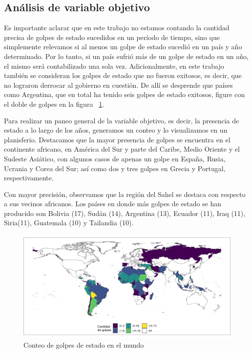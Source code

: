 \documentclass{article}
\begin{document}
\subsection{Análisis de variable objetivo}

Es importante aclarar que en este trabajo no estamos contando la cantidad precisa
de golpes de estado sucedidos en un período de tiempo, sino que simplemente relevamos
si al menos un golpe de estado sucedió en un país y año determinado. Por lo tanto, si
un país sufrió más de un golpe de estado en un año, el mismo será contabilizado una
sola vez. Adicionalmente, en este trabajo también se consideran los golpes de estado
que no fueron exitosos, es decir, que no lograron derrocar al gobierno en cuestión. De
allí se desprende que países como Argentina, que en total ha tenido seis golpes de estado
exitosos, figure con el doble de golpes en la figura ~\ref{fig::mapa_golpes}.

Para realizar un paneo general de la variable objetivo, es decir, la presencia de
estado a lo largo de los años, generamos un conteo y lo visualizamos en un 
planisferio. Destacamos que la mayor presencia de golpes se encuentra en el continente
africano, en América del Sur y parte del Caribe, Medio Oriente y el Sudeste Asiático, 
con algunos casos de apenas un golpe en España, Rusia, Ucrania y Corea del Sur; así como
dos y tres golpes en Grecia y Portugal, respectivamente.

Con mayor precisión, observamos que la región del Sahel se destaca con respecto a sus
vecinos africanos. Los países en donde más golpes de estado se han producido son
Bolivia (17), Sudán (14), Argentina (13), Ecuador (11), Iraq (11), Siria(11), Guatemala
(10) y Tailandia (10).

\begin{figure}[H]
  \centering  
  \includegraphics[width=1\textwidth]{2_golpes.png}
  \caption{Conteo de golpes de estado en el mundo\label{fig::mapa_golpes}}
\end{figure}
\end{document}
